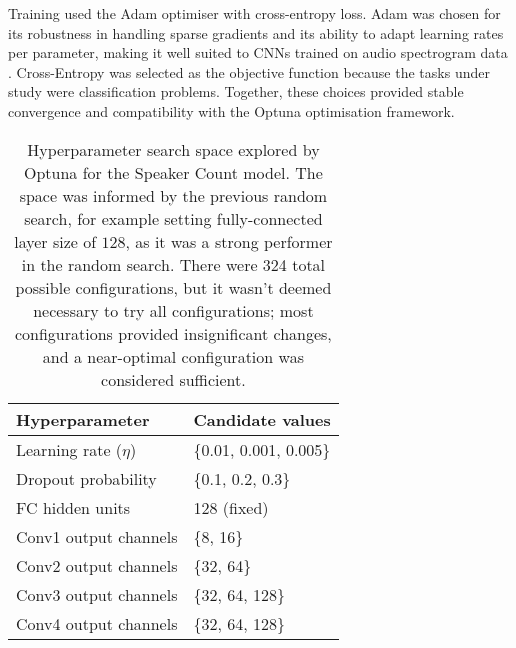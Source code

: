 \noindent Training used the Adam optimiser with cross-entropy loss. Adam was chosen for its robustness in handling sparse gradients and its ability to adapt learning rates per parameter, making it well suited to CNNs trained on audio spectrogram data \cite{adam}. Cross-Entropy was selected as the objective function because the tasks under study were classification problems. Together, these choices provided stable convergence and compatibility with the Optuna optimisation framework.


\begin{table}[H]
\centering
\caption{Hyperparameter search space explored by Optuna for the Speaker Count model. The space was informed by the previous random search, for example setting fully-connected layer size of $128$, as it was a strong performer in the random search. There were 324 total possible configurations, but it wasn't deemed necessary to try all configurations; most configurations provided insignificant changes, and a near-optimal configuration was considered sufficient.}
\label{tab:optuna_search_space}
\begin{tabular}{ll}
\hline
Hyperparameter & Candidate values \\
\hline
Learning rate ($\eta$) & \{0.01, 0.001, 0.005\} \\
Dropout probability & \{0.1, 0.2, 0.3\} \\
FC hidden units & 128 (fixed) \\
Conv1 output channels & \{8, 16\} \\
Conv2 output channels & \{32, 64\} \\
Conv3 output channels & \{32, 64, 128\} \\
Conv4 output channels & \{32, 64, 128\} \\
\hline
\end{tabular}
\label{tab:optuna_space}
\end{table}


